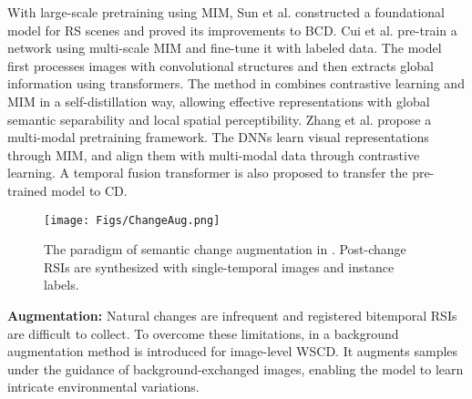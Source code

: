 With large-scale pretraining using MIM, Sun et al. \cite{sun2022ringmo} constructed a foundational model for RS scenes and proved its improvements to BCD. Cui et al. \cite{cui2023hybrid} pre-train a network using multi-scale MIM and fine-tune it with labeled data. The model first processes images with convolutional structures and then extracts global information using transformers. The method in \cite{muhtar2023cmid} combines contrastive learning and MIM in a self-distillation way, allowing effective representations with global semantic separability and local spatial perceptibility. Zhang et al. \cite{zhang2023self} propose a multi-modal pretraining framework. The DNNs learn visual representations through MIM, and align them with multi-modal data through contrastive learning. A temporal fusion transformer is also proposed to transfer the pre-trained model to CD.

\begin{comment}
\textbf{Auxiliary supervision:} Apart from contrastive learning and MIM, some literature works design other auxiliary supervisions to facilitate self-supervised change learning. 
In \cite{wang2021attention}, a self-supervised spatial feature extraction network is built with PCA guidance, mapping differences to principal differential components. The attention mechanism weighs and concatenates spatial and spectral features, yielding change results at different positions. Specifically, the changed and unchanged regions are first determined on the basis of the labels. In unchanged regions, the probability map is used as pseudo-labels, while in changed regions, the opposite result is used as pseudo-labels. 
\end{comment}

\begin{figure}[t!]
	\begin{center}
        \texttt{[image: Figs/ChangeAug.png]}
	\end{center}
	\caption{The paradigm of semantic change augmentation in \cite{zheng2023scalable}. Post-change RSIs are synthesized with single-temporal images and instance labels.}
	\label{fig.ChangeAug}
\end{figure}


\textbf{Augmentation:} Natural changes are infrequent and registered bitemporal RSIs are difficult to collect. To overcome these limitations, in \cite{huang2023backgroundmixed} a background augmentation method is introduced for image-level WSCD. It augments samples under the guidance of background-exchanged images, enabling the model to learn intricate environmental variations. 

